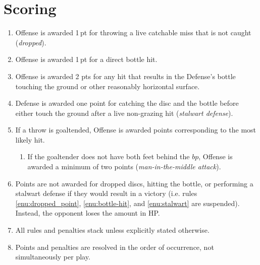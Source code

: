 \documentclass[11pt,letterpaper,twocolumn,english,DIV=calc]{scrartcl}
\begin{document}
\section{Scoring}
\begin{enumerate}
	\item \label{enu:dropped_point}Offense is awarded 1\,pt for throwing a live catchable miss that is not caught (\emph{dropped}).
	\item \label{enu:bottle-hit}Offense is awarded 1\,pt for a direct bottle hit.
	\item Offense is awarded 2 pts for any hit that results in the Defense's bottle touching the ground or other reasonably horizontal surface.
	\item \label{enu:stalwart}Defense is awarded one point for catching the disc and the bottle before either touch the ground after a live non-grazing hit (\emph{stalwart defense}). 

	\item If a throw is goaltended, Offense is awarded points corresponding to the most likely hit.
	\begin{enumerate}
		\item If the goaltender does not have both feet behind the $bp$, Offense is awarded a minimum of two points (\emph{man-in-the-middle attack}).
	\end{enumerate}

	\item Points are not awarded for dropped discs, hitting the bottle, or performing a stalwart defense if they would result in a victory (i.e. rules \ref{enu:dropped_point}, \ref{enu:bottle-hit}, and \ref{enu:stalwart} are suspended). Instead, the opponent loses the amount in HP.

	\item All rules and penalties stack unless explicitly stated otherwise.
	\item Points and penalties are resolved in the order of occurrence, not simultaneously per play.
\end{enumerate}
\end{document}
